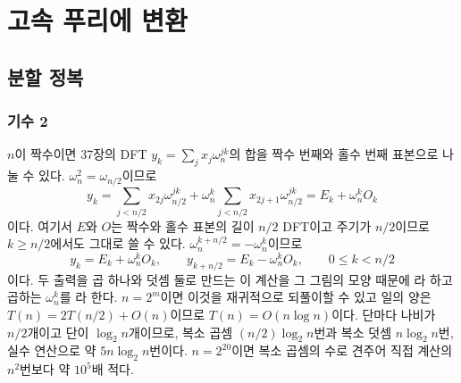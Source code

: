 \chapter{고속 푸리에 변환}
\label{ch:fft}


\section{분할 정복}
\label{sec:cooley-tukey}

\subsection{기수 2}

$n$이 짝수이면 37장의 DFT $y_k=\sum_jx_j\omega_n^{jk}$의 합을 짝수 번째와 홀수 번째 표본으로 나눌 수 있다. $\omega_n^2=\omega_{n/2}$이므로
\[
y_k=\sum_{j<n/2}x_{2j}\omega_{n/2}^{jk}+\omega_n^k\sum_{j<n/2}x_{2j+1}\omega_{n/2}^{jk}=E_k+\omega_n^kO_k
\]
이다. 여기서 $E$와 $O$는 짝수와 홀수 표본의 길이 $n/2$ DFT이고 주기가 $n/2$이므로 $k\ge n/2$에서도 그대로 쓸 수 있다. $\omega_n^{k+n/2}=-\omega_n^k$이므로
\begin{equation}
\label{eq:butterfly}
y_k=E_k+\omega_n^kO_k,\qquad y_{k+n/2}=E_k-\omega_n^kO_k,\qquad0\le k<n/2
\end{equation}
이다. 두 출력을 곱 하나와 덧셈 둘로 만드는 이 계산을 그 그림의 모양 때문에 라 하고 곱하는 $\omega_n^k$를 라 한다. $n=2^m$이면 이것을 재귀적으로 되풀이할 수 있고 일의 양은 $T(n)=2T(n/2)+O(n)$이므로 $T(n)=O(n\log n)$이다. 단마다 나비가 $n/2$개이고 단이 $\log_2n$개이므로, 복소 곱셈 $(n/2)\log_2n$번과 복소 덧셈 $n\log_2n$번, 실수 연산으로 약 $5n\log_2n$번이다. $n=2^{20}$이면 복소 곱셈의 수로 견주어 직접 계산의 $n^2$번보다 약 $10^5$배 적다.


